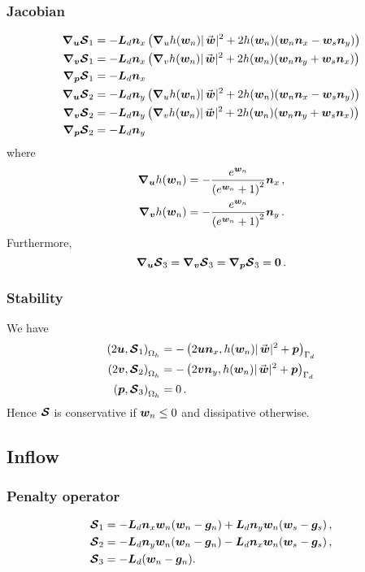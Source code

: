 \subsubsection*{Jacobian}
\begin{align*}
  \nablan_{\un} \satn_1 &= -\Lng \nnx\left(\nablan_{u}h(\wnn)|\wn|^2 + 2h(\wnn) (\wnn \nnx - \wtn \nny)\right) \\
\nablan_{\vn} \satn_1 &= -\Lng \nnx\left(\nablan_{v}h(\wnn)|\wn|^2 + 2h(\wnn) (\wnn \nny + \wtn \nnx)\right) \\
  \nablan_{\pn} \satn_1 &= -\Lng \nnx \\
  \nablan_{\un} \satn_2 &= -\Lng \nny\left(\nablan_{u}h(\wnn)|\wn|^2 + 2h(\wnn) (\wnn \nnx - \wtn \nny)\right) \\
  \nablan_{\vn} \satn_2 &= -\Lng \nny\left(\nablan_{v}h(\wnn)|\wn|^2 + 2h(\wnn) (\wnn \nny + \wtn \nnx)\right) \\
  \nablan_{\pn} \satn_2 &= -\Lng \nny
\end{align*}
where
\begin{align*}
  \bm{\nabla}_{\bm{u}}h(\bm{w}_n) &= -\frac{e^{\bm{w}_n}}{{(e^{\bm{w}_n} + 1)}^2}\bm{n}_x \,,
  \\
  \bm{\nabla}_{\bm{v}}h(\bm{w}_n) &= -\frac{e^{\bm{w}_n}}{{(e^{\bm{w}_n} + 1)}^2}\bm{n}_y \,.
\end{align*}
Furthermore,
\[ \bm{\nabla}_{\bm{u}} \bm{\mathcal{S}}_3 = \bm{\nabla}_{\bm{v}} \bm{\mathcal{S}}_3 = \bm{\nabla}_{\bm{p}} \bm{\mathcal{S}}_3 = \bm{0} \,. \]

\subsubsection*{Stability}
We have
\begin{align*}
  \ipn{2\un}{\satn_1} & = -\ipbn{2\un \nnx}{h(\wnn)|\wn|^2 + \pn} \\
  \ipn{2\vn}{\satn_2} & = -\ipbn{2\vn \nny}{h(\wnn)|\wn|^2 + \pn} \\
  \ipn{\pn}{\satn_3}  & = 0 \,.
\end{align*}
Hence $\bm{\mathcal{S}}$ is conservative if $\bm{w}_n \leq 0$ and dissipative otherwise.

\subsection{Inflow}%
\label{sub:inflow}
\subsubsection*{Penalty operator}
  \begin{equation*}
    \begin{aligned}
      \bm{\mathcal{S}}_1 &= -\bm{L}_d \bm{n}_x \bm{w}_n (\bm{w}_n - \bm{g}_n) + \bm{L}_d \bm{n}_y \bm{w}_n (\bm{w}_s - \bm{g}_s)\,, \\
      \bm{\mathcal{S}}_2 &= -\bm{L}_d \bm{n}_y \bm{w}_n (\bm{w}_n - \bm{g}_n) - \bm{L}_d \bm{n}_x \bm{w}_n (\bm{w}_s - \bm{g}_s)\,, \\
      \bm{\mathcal{S}}_3 &= -\bm{L}_d(\bm{w}_n - \bm{g}_n).
    \end{aligned}
  \end{equation*}


